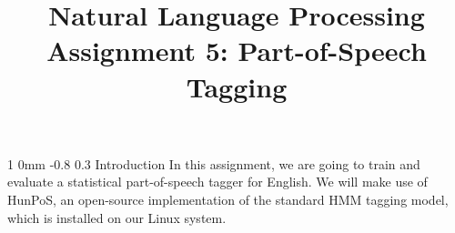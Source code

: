 \documentclass[11pt]{article}
\title{{\LARGE Natural Language Processing}\\[1.5mm]{\large Assignment 5: Part-of-Speech Tagging}}
\author{}
\date{} %
\makeatletter
\newcommand{\newsec}[2]{\section{#1}\label{sec:#2}\noindent}
\renewcommand{\section}{\@startsection
{section}%
{1}%
{0mm}%
{-0.8\baselineskip}%
{0.3\baselineskip}%
{\bfseries\large}}%
\makeatother
\begin{document}
 

\maketitle
\vspace{-2mm}
\newsec{Introduction}{intro}%
In this assignment, we are going to train and evaluate a statistical part-of-speech tagger for English. We will make use of HunPoS, an open-source implementation of the
standard HMM tagging model, which is installed on our Linux system. 
\end{document}
